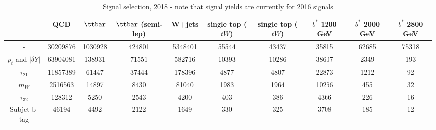 \begin{table}[] 
\begin{tabular}{|c|ccccccccc|} 
\hline 
 &QCD	& $\ttbar$	& $\ttbar$ (semi-lep)	& W+jets	& single top ($tW$)	& single top ($\bar{t}W$)	& $b^{*}$ 1200 GeV	& $b^{*}$ 2000 GeV	& $b^{*}$ 2800 GeV	\\ 
\hline 
	-	& 30209876	& 1030928	& 424801	& 5348401	& 55544	& 43437	& 35815	& 62685	& 75318	\\ 
	$p_{t}$ and $|\delta Y|$	& 63904081	& 138931	& 71551	& 582716	& 10393	& 10286	& 38607	& 2349	& 193	\\ 
	$\tau_{21}$	& 11857389	& 61447	& 37444	& 178396	& 4877	& 4807	& 22873	& 1212	& 92	\\ 
	$m_{W}$	& 2516563	& 14897	& 8430	& 81040	& 1983	& 1964	& 10266	& 455	& 32	\\ 
	$\tau_{32}$	& 128312	& 5250	& 2543	& 4200	& 403	& 386	& 4366	& 226	& 16	\\ 
	Subjet b-tag	& 46194	& 4492	& 2122	& 1649	& 330	& 325	& 3708	& 185	& 12	\\ 
\hline 
\end{tabular} 
\caption{Signal selection, 2018 - note that signal yields are currently for 2016 signals} 
\end{table}